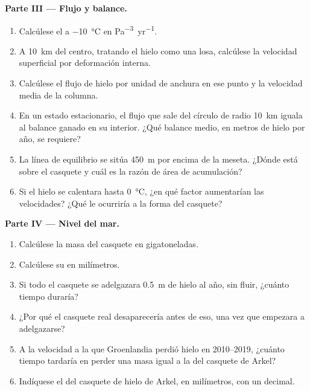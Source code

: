 \begin{problem}
\medskip\noindent\textbf{Parte III --- Flujo y balance.}
\begin{enumerate}[resume]
\item Calcúlese el  a \qty{-10}{\celsius} en
  \unit{Pa^{-3}.yr^{-1}}.
\item A \qty{10}{km} del centro, tratando el hielo como una losa, calcúlese
  la velocidad superficial por deformación interna.
\item Calcúlese el flujo de hielo por unidad de anchura en ese punto y la velocidad media de
  la columna.
\item En un estado estacionario, el flujo que sale del círculo de radio
  \qty{10}{km} iguala al balance ganado en su interior. ¿Qué balance medio, en
  metros de hielo por año, se requiere?
\item La línea de equilibrio se sitúa \qty{450}{m} por encima de la meseta. ¿Dónde está sobre el
  casquete y cuál es la razón de área de acumulación?
\item Si el hielo se calentara hasta \qty{0}{\celsius}, ¿en qué factor aumentarían las
  velocidades? ¿Qué le ocurriría a la forma del casquete?
\end{enumerate}

\medskip\noindent\textbf{Parte IV --- Nivel del mar.}
\begin{enumerate}[resume]
\item Calcúlese la masa del casquete en gigatoneladas.
\item Calcúlese su  en milímetros.
\item Si todo el casquete se adelgazara \qty{0.5}{m} de hielo al año, sin
  fluir, ¿cuánto tiempo duraría?
\item ¿Por qué el casquete real desaparecería antes de eso, una vez que empezara a
  adelgazarse?
\item A la velocidad a la que Groenlandia perdió hielo en 2010--2019, ¿cuánto tiempo tardaría
  en perder una masa igual a la del casquete de Arkel?
\item Indíquese el  del casquete de hielo de Arkel, en milímetros,
  con un decimal.
\end{enumerate}
\end{problem}
